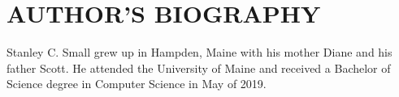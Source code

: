 \documentclass{article}
\begin{document}
\begin{singlespace}
               
               
\end{singlespace}


\newpage
{}
\vspace*{.05in}
\section*{\MakeUppercase{Author's Biography}}
Stanley C. Small grew up in Hampden, Maine with his mother Diane and his father Scott. He attended the University of Maine and received a Bachelor of Science degree in Computer Science in May of 2019. 
\end{document}
